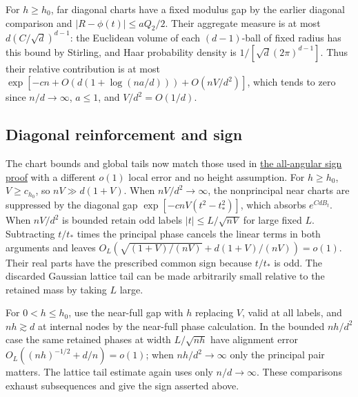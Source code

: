 For $h\ge h_0$, far diagonal charts have a fixed modulus gap by the earlier diagonal comparison and $|R-\phi(t)|\le aQ_2/2$. Their aggregate measure is at most $d(C/\sqrt d)^{d-1}$: the Euclidean volume of each $(d-1)$-ball of fixed radius has this bound by Stirling, and Haar probability density is $1/[\sqrt d(2\pi)^{d-1}]$. Thus their relative contribution is at most $\exp[-cn+O(d(1+\log(na/d)))+O(nV/d^2)]$, which tends to zero since $n/d\to\infty$, $a\le1$, and $V/d^2=O(1/d)$.

\subsection{Diagonal reinforcement and sign}

The chart bounds and global tails now match those used in \href{https://github.com/ProgramComputer/open-math-research/blob/78e9ef2c0c0b7a5daed126efbe12a46d030d8200/topics/balanced-arrays/fifth-thirds/subquadratic-angular-nodes.md}{the all-angular sign proof} with a different $o(1)$ local error and no height assumption. For $h\ge h_0$, $V\ge c_{h_0}$, so $nV\gg d(1+V)$. When $nV/d^2\to\infty$, the nonprincipal near charts are suppressed by the diagonal gap $\exp[-c n V(t^2-t_*^2)]$, which absorbs $e^{Cd B_t}$. When $nV/d^2$ is bounded retain odd labels $|t|\le L/\sqrt{nV}$ for large fixed $L$. Subtracting $t/t_*$ times the principal phase cancels the linear terms in both arguments and leaves $O_L(\sqrt{(1+V)/(nV)}+d(1+V)/(nV))=o(1)$. Their real parts have the prescribed common sign because $t/t_*$ is odd. The discarded Gaussian lattice tail can be made arbitrarily small relative to the retained mass by taking $L$ large.

For $0<h\le h_0$, use the near-full gap with $h$ replacing $V$, valid at all labels, and $nh\gtrsim d$ at internal nodes by the near-full phase calculation. In the bounded $nh/d^2$ case the same retained phases at width $L/\sqrt{nh}$ have alignment error $O_L((nh)^{-1/2}+d/n)=o(1)$; when $nh/d^2\to\infty$ only the principal pair matters. The lattice tail estimate again uses only $n/d\to\infty$. These comparisons exhaust subsequences and give the sign asserted above.
